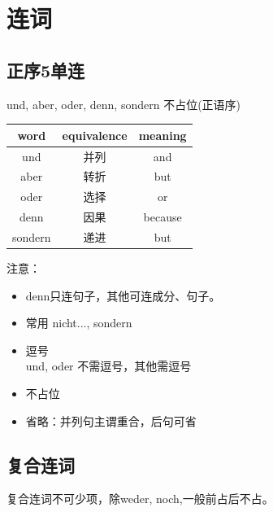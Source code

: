 \chapter{连词}

\section{正序5单连}
\label{sec:conj:und}
und, aber, oder, denn, sondern 不占位(正语序)

\begin{center}
    \begin{tabular}{|c|c|c|}
        \hline
        \rowcolor{gray}
        word    & equivalence & meaning \\
        \hline
        und     & 并列          & and     \\
        aber    & 转折          & but     \\
        oder    & 选择          & or      \\
        denn    & 因果          & because \\
        sondern & 递进          & but     \\
        \hline
    \end{tabular}
\end{center}

注意：
\begin{itemize}
    \item denn只连句子，其他可连成分、句子。
    \item 常用 nicht..., sondern
    \item 逗号 \\
          und, oder 不需逗号，其他需逗号
    \item 不占位
    \item 省略：并列句主谓重合，后句可省
\end{itemize}

\section{复合连词}

复合连词不可少项，除weder, noch,一般前占后不占。

